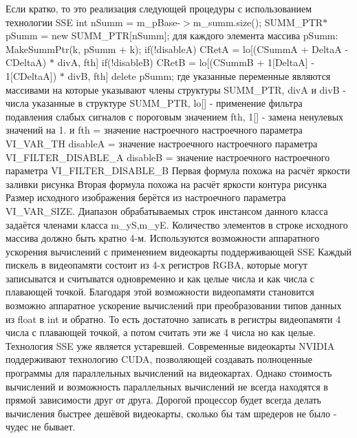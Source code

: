 Если кратко, то это реализация следующей процедуры с использованием технологии S\+S\+E int n\+Summ = m\+\_\+p\+Base-\/$>$m\+\_\+summ.\+size(); S\+U\+M\+M\+\_\+\+P\+T\+R$\ast$ p\+Summ = new S\+U\+M\+M\+\_\+\+P\+T\+R\mbox{[}n\+Summ\mbox{]}; для каждого элемента массива p\+Summ\+: Make\+Summ\+Ptr(k, p\+Summ + k); if(!disable\+A) C\+Ret\+A = lo\mbox{[}(C\+Summ\+A + Delta\+A -\/ C\+Delta\+A) $\ast$ div\+A, fth\mbox{]} if(!disable\+B) C\+Ret\+B = lo\mbox{[}(C\+Summ\+B + 1\mbox{[}Delta\+A\mbox{]} -\/ 1\mbox{[}C\+Delta\+A\mbox{]}) $\ast$ div\+B, fth\mbox{]} delete p\+Summ; где указанные переменные являются массивами на которые указывают члены структуры S\+U\+M\+M\+\_\+\+P\+T\+R, div\+A и div\+B -\/ числа указанные в структуре S\+U\+M\+M\+\_\+\+P\+T\+R, lo\mbox{[}\mbox{]} -\/ применение фильтра подавления слабых сигналов с пороговым значением fth, 1\mbox{[}\mbox{]} -\/ замена ненулевых значений на 1. и fth = значение настроечного настроечного параметра V\+I\+\_\+\+V\+A\+R\+\_\+\+T\+H disable\+A = значение настроечного настроечного параметра V\+I\+\_\+\+F\+I\+L\+T\+E\+R\+\_\+\+D\+I\+S\+A\+B\+L\+E\+\_\+\+A disable\+B = значение настроечного настроечного параметра V\+I\+\_\+\+F\+I\+L\+T\+E\+R\+\_\+\+D\+I\+S\+A\+B\+L\+E\+\_\+\+B Первая формула похожа на расчёт яркости заливки рисунка Вторая формула похожа на расчёт яркости контура рисунка Размер исходного изображения берётся из настроечного параметра V\+I\+\_\+\+V\+A\+R\+\_\+\+S\+I\+Z\+E. Диапазон обрабатываемых строк инстансом данного класса задаётся членами класса m\+\_\+y\+S,m\+\_\+y\+E. Количество элементов в строке исходного массива должно быть кратно 4-\/м. Используются возможности аппаратного ускорения вычислений с применением видеокарты поддерживающей S\+S\+E Каждый пискель в видеопамяти состоит из 4-\/х регистров R\+G\+B\+A, которые могут записыватся и считыватся одновременно и как целые числа и как числа с плавающей точкой. Благодаря этой возможности видеопамяти становится возможно аппаратное ускорение вычислений при преобразовании типов данных из float в int и обратно. То есть достаточно записать в регистры видеопамяти 4 числа с плавающей точкой, а потом считать эти же 4 числа но как целые. Технология S\+S\+E уже является устаревшей. Современные видеокарты N\+V\+I\+D\+I\+A поддерживают технологию C\+U\+D\+A, позволяющей создавать полноценные программы для параллельных вычислений на видеокартах. Однако стоимость вычислений и возможность параллельных вычислений не всегда находятся в прямой зависимости друг от друга. Дорогой процессор будет всегда делать вычисления быстрее дешёвой видеокарты, сколько бы там шредеров не было -\/ чудес не бывает. 

